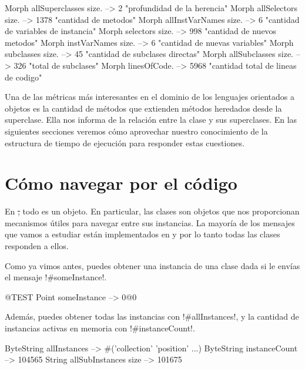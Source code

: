 \documentclass[a4paper,10pt,twoside]{book}
\begin{document}
\begin{code}{}
Morph allSuperclasses size.  -->       2 "profundidad de la herencia"
Morph allSelectors size.        --> 1378 "cantidad de metodos"
Morph allInstVarNames size. -->      6 "cantidad de variables de instancia"
Morph selectors size.             -->  998 "cantidad de nuevos metodos"
Morph instVarNames size.     -->      6 "cantidad de nuevas variables"
Morph subclasses size.          -->    45 "cantidad de subclases directas"
Morph allSubclasses size.      -->  326 "total de subclases"
Morph linesOfCode.               --> 5968 "cantidad total de lineas de codigo"
\end{code}

Una de las métricas más interesantes en el dominio de los lenguajes
orientados a objetos es la cantidad de métodos que extienden métodos
heredados desde la superclase.  Ella nos informa de la relación entre
la clase y sus superclases.  En las siguientes secciones veremos cómo
aprovechar nuestro conocimiento de la estructura de tiempo de
ejecución para responder estas cuestiones.

\section{Cómo navegar por el código}

En \st, todo es un objeto.  En particular, las clases son objetos que
nos proporcionan mecanismos útiles para navegar entre sus instancias.
La mayoría de los mensajes que vamos a estudiar están implementados en
 y por lo tanto todas las clases responden a ellos.

Como ya vimos antes, puedes obtener una instancia de una clase dada si
le envías el mensaje \ct!#someInstance!.
\begin{code}{@TEST} %
Point someInstance --> 0@0
\end{code}

Además, puedes obtener todas las instancias con \ct!#allInstances!, y
la cantidad de instancias activas en memoria con \ct!#instanceCount!.

\begin{code}{} %
ByteString allInstances        --> #('collection' 'position'  ...)
ByteString instanceCount    --> 104565
String allSubInstances size -->  101675
\end{code}
\end{document}
